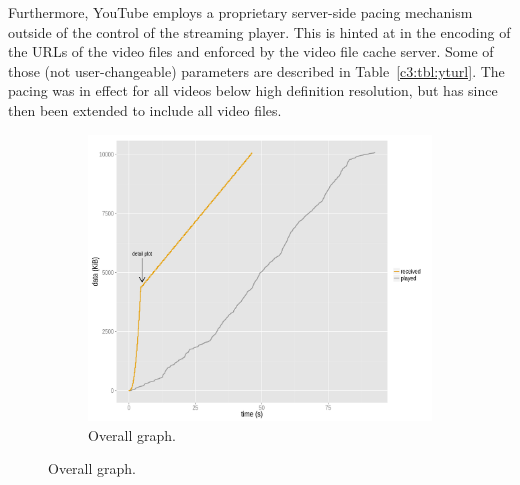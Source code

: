 Furthermore, YouTube employs a proprietary server-side pacing mechanism outside of the control of the streaming player. This is hinted at in the encoding of the \glspl{URL} of the video files and enforced by the video file cache server. Some of those (not user-changeable) parameters are described in Table~\ref{c3:tbl:yturl}. The pacing was in effect for all videos below high definition resolution, but has since then been extended to include all video files. 

\begin{figure}[htbp]
	\centering
	\begin{subfigure}[b]{0.9\textwidth}
		\centering
		\includegraphics[width=\textwidth]{images/R-blocktransfer.pdf}
		\caption{Overall graph.}
		\label{c3:fig:blocktransfer-overall}
	\end{subfigure}


\end{figure}
